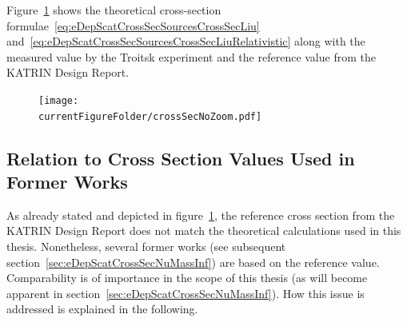 Figure~\ref{fig:eDepScatCrossSecSourcesValues} shows the theoretical cross-section formulae~\eqref{eq:eDepScatCrossSecSourcesCrossSecLiu} and~\eqref{eq:eDepScatCrossSecSourcesCrossSecLiuRelativistic} along with the measured value by the Troitsk experiment and the reference value from the KATRIN Design Report.

\begin{figure}[t]
	\centering
	\texttt{[image: \\currentFigureFolder/crossSecNoZoom.pdf]}
	\label{fig:eDepScatCrossSecSourcesValues}
\end{figure}

\subsection{Relation to Cross Section Values Used in Former Works}
\label{sec:eDepScatCrossSecSourcesChoice}
As already stated and depicted in figure~\ref{fig:eDepScatCrossSecSourcesValues}, the reference cross section from the KATRIN Design Report does not match the theoretical calculations used in this thesis. Nonetheless, several former works (see subsequent section~\ref{sec:eDepScatCrossSecNuMassInf}) are based on the reference value. Comparability is of importance in the scope of this thesis (as will become apparent in section~\ref{sec:eDepScatCrossSecNuMassInf}). How this issue is addressed is explained in the following.


